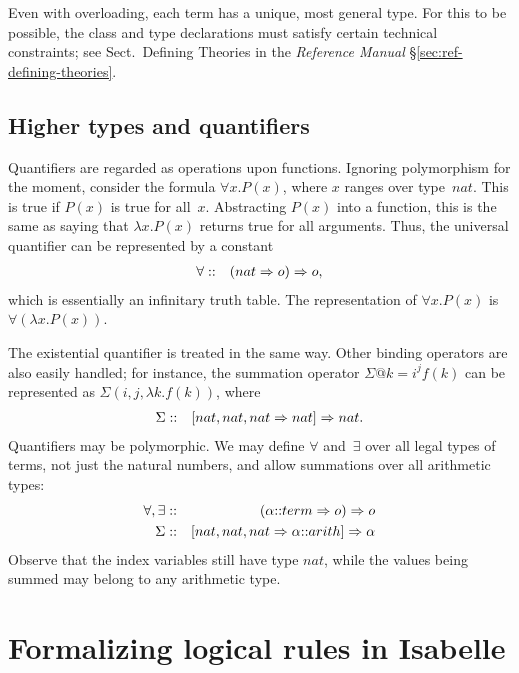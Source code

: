 Even with overloading, each term has a unique, most general type.  For this
to be possible, the class and type declarations must satisfy certain
technical constraints; see 
%
           {Sect.\ Defining Theories in the {\em Reference Manual}}%
           {\S\ref{sec:ref-defining-theories}}.


\subsection{Higher types and quantifiers}
Quantifiers are regarded as operations upon functions.  Ignoring polymorphism
for the moment, consider the formula $\forall x. P(x)$, where $x$ ranges
over type~$nat$.  This is true if $P(x)$ is true for all~$x$.  Abstracting
$P(x)$ into a function, this is the same as saying that $\lambda x.P(x)$
returns true for all arguments.  Thus, the universal quantifier can be
represented by a constant
\begin{eqnarray*}
  \forall  & :: & (nat\Rightarrow o) \Rightarrow o,
\end{eqnarray*}
which is essentially an infinitary truth table.  The representation of $\forall
x. P(x)$ is $\forall(\lambda x. P(x))$.  

The existential quantifier is treated
in the same way.  Other binding operators are also easily handled; for
instance, the summation operator $\Sigma@{k=i}^j f(k)$ can be represented as
$\Sigma(i,j,\lambda k.f(k))$, where
\begin{eqnarray*}
  \Sigma  & :: & [nat,nat, nat\Rightarrow nat] \Rightarrow nat.
\end{eqnarray*}
Quantifiers may be polymorphic.  We may define $\forall$ and~$\exists$ over
all legal types of terms, not just the natural numbers, and
allow summations over all arithmetic types:
\begin{eqnarray*}
   \forall,\exists      & :: & (\alpha{::}term\Rightarrow o) \Rightarrow o \\
   \Sigma               & :: & [nat,nat, nat\Rightarrow \alpha{::}arith] \Rightarrow \alpha
\end{eqnarray*}
Observe that the index variables still have type $nat$, while the values
being summed may belong to any arithmetic type.


\section{Formalizing logical rules in Isabelle}

